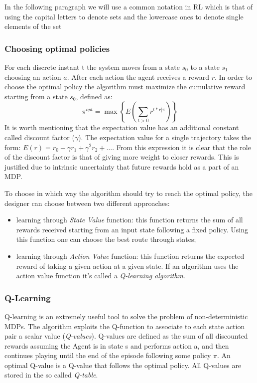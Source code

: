 In the following paragraph we will use a common notation in RL which is that of using the capital letters to denote sets and the lowercase ones to denote single elements of the set

\subsubsection{Choosing optimal policies}

For each discrete instant t the system moves from a state $s_{0}$ to a state $s_{1}$ choosing an action $a$.
After each action the agent receives a reward $r$. 
In order to choose the optimal policy the algorithm must maximize the cumulative reward starting from a state $s_{0}$, defined as: 
\begin{equation*}
\pi^{opt} = \max\left\{E\left(\sum_{t>0}r^{t*r|\pi}\right)\right\}
\end{equation*}
It is worth mentioning that the expectation value has an additional constant called discount factor ($\gamma$).
The expectation value for a single trajectory takes the form: $E(r) = r_{0} + \gamma r_{1} + \gamma^{2} r_{2} + \ldots$.
From this expression it is clear that the role of the discount factor is that of giving more weight to closer rewards.
This is justified due to intrinsic uncertainty that future rewards hold as a part of an MDP.

To choose in which way the algorithm should try to reach the optimal policy, the designer can choose between two different approaches:
\begin{itemize}
    \item learning through \emph{State Value} function: this function returns the sum of all rewards received starting from an input state following a fixed policy.
        Using this function one can choose the best route through states;
    \item learning through \emph{Action Value} function: this function returns the expected reward of taking a given action at a given state.
        If an algorithm uses the action value function it's called a \emph{Q-learning algorithm}.    
\end{itemize}

\subsubsection{Q-Learning} \label{Qlearning}

Q-learning is an extremely useful tool to solve the problem of non-deterministic MDPs.
The algorithm exploits the Q-function to associate to each state action pair a scalar value (\emph{Q-values}).
Q-values are defined as the sum of all discounted rewards assuming the Agent is in state s and performs action a, and then continues playing until the end of the episode following some policy $\pi$.
An optimal Q-value is a Q-value that follows the optimal policy. All Q-values are stored in the so called \emph{Q-table}.

